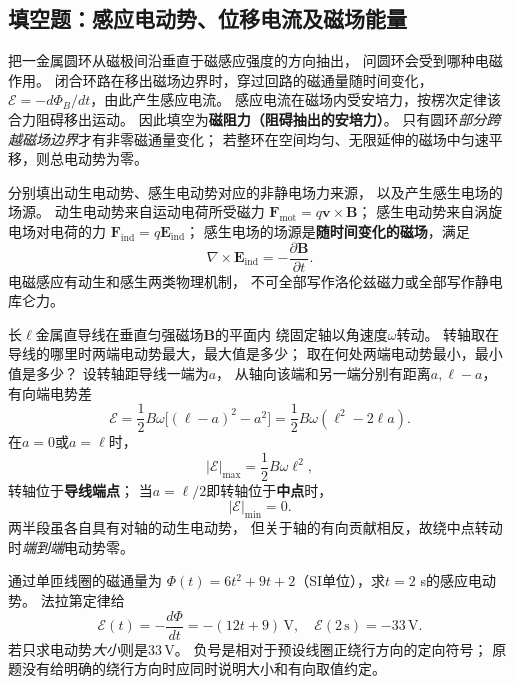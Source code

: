
\subsection{填空题：感应电动势、位移电流及磁场能量}

\problemtext 把一金属圆环从磁极间沿垂直于磁感应强度的方向抽出，
问圆环会受到哪种电磁作用。
\workings
闭合环路在移出磁场边界时，穿过回路的磁通量随时间变化，
$\mathcal E=-d\Phi_B/dt$，由此产生感应电流。
感应电流在磁场内受安培力，按楞次定律该合力阻碍移出运动。
因此填空为\textbf{磁阻力（阻碍抽出的安培力）}。
\crosscheck 只有圆环\emph{部分跨越磁场边界}才有非零磁通量变化；
若整环在空间均匀、无限延伸的磁场中匀速平移，则总电动势为零。

\problemtext 分别填出动生电动势、感生电动势对应的非静电场力来源，
以及产生感生电场的场源。
\workings
动生电动势来自运动电荷所受磁力
$\boxed{\bm F_{\mathrm{mot}}=q\bm v\times\bm B}$；
感生电动势来自涡旋电场对电荷的力
$\boxed{\bm F_{\mathrm{ind}}=q\bm E_{\mathrm{ind}}}$；
感生电场的场源是\textbf{随时间变化的磁场}，满足
\[
\boxed{\nabla\times\bm E_{\mathrm{ind}}
=-\frac{\partial\bm B}{\partial t}}.
\]
\crosscheck 电磁感应有动生和感生两类物理机制，
不可全部写作洛伦兹磁力或全部写作静电库仑力。

\problemtext 长$\ell$金属直导线在垂直匀强磁场$\bm B$的平面内
绕固定轴以角速度$\omega$转动。
转轴取在导线的哪里时两端电动势最大，最大值是多少；
取在何处两端电动势最小，最小值是多少？
\workings
设转轴距导线一端为$a$，
从轴向该端和另一端分别有距离$a,\ell-a$，
有向端电势差
\[
\mathcal E=\frac12B\omega
\bigl[(\ell-a)^2-a^2\bigr]
=\frac12B\omega(\ell^2-2\ell a).
\]
在$a=0$或$a=\ell$时，
\[
\boxed{|\mathcal E|_{\max}=\frac12B\omega\ell^2},
\]
转轴位于\textbf{导线端点}；
当$a=\ell/2$即转轴位于\textbf{中点}时，
\[
\boxed{|\mathcal E|_{\min}=0}.
\]
\crosscheck 两半段虽各自具有对轴的动生电动势，
但关于轴的有向贡献相反，故绕中点转动时\emph{端到端}电动势零。

\problemtext 通过单匝线圈的磁通量为
$\Phi(t)=6t^2+9t+2$（SI单位），求$t=2$ s的感应电动势。
\workings
法拉第定律给
\[
\mathcal E(t)=-\frac{d\Phi}{dt}=-(12t+9)\,\mathrm V,
\quad\boxed{\mathcal E(2\,\mathrm s)=-33\,\mathrm V}.
\]
若只求电动势\emph{大小}则是$\boxed{33\,\mathrm V}$。
\crosscheck 负号是相对于预设线圈正绕行方向的定向符号；
原题没有给明确的绕行方向时应同时说明大小和有向取值约定。

